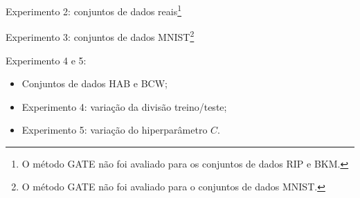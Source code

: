 \documentclass{beamer}
\newcommand{\tabela}[3]{
\begin{table}[!htbp]
  \scalefont{#3}
  \begin{center}
  \caption{#2}\label{tab:#1}
    
  \end{center}
\end{table}
}
\begin{document}
\begin{frame}[noframenumbering]{Experimento 2: conjuntos de dados reais\footnote[frame]{O método GATE não foi avaliado para os conjuntos de dados RIP e BKM.}}
\end{frame}


\begin{frame}{Experimento 3: conjuntos de dados MNIST\footnote[frame]{O método GATE não foi avaliado para o conjuntos de dados MNIST.}}
\end{frame}

\begin{frame}{Experimento 4 e 5: }
  \begin{itemize}
    \item Conjuntos de dados HAB e BCW;
    \item Experimento 4: variação da divisão treino/teste;
    \item Experimento 5: variação do hiperparâmetro $C$.
  \end{itemize}
\end{frame}
\end{document}
